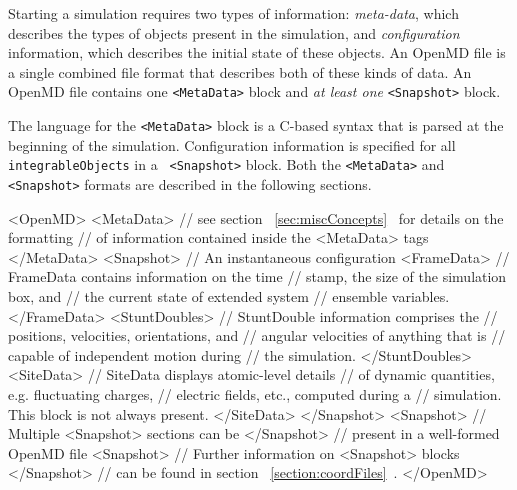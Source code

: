 \documentclass[letterpaper]{report}
\begin{document}
Starting a simulation requires two types of information: {\it
meta-data}, which describes the types of objects present in the
simulation, and {\it configuration} information, which describes the
initial state of these objects.  An OpenMD file is a single
combined file format that describes both of these kinds of data.  An
OpenMD file contains one {\tt <MetaData>} block and {\it at least
one} {\tt <Snapshot>} block.

The language for the {\tt <MetaData>} block is a C-based syntax that
is parsed at the beginning of the simulation.  Configuration
information is specified for all {\tt integrableObjects} in a {\tt
<Snapshot>} block.  Both the {\tt <MetaData>} and {\tt <Snapshot>}
formats are described in the following sections.

\begin{code}[caption={[The structure of an OpenMD file]
The basic structure of an OpenMD file contains HTML-like tags to
define simulation meta-data and subsequent instantaneous configuration
information. A well-formed OpenMD file must contain one {\tt <MetaData>}
block and {\it at least one} {\tt <Snapshot>} block.  Each
{\tt <Snapshot>} is further divided into {\tt <FrameData>} and 
 {\tt <StuntDoubles>} sections.},label={sch:mdFormat}]
<OpenMD>
  <MetaData>
      // see section ~\ref{sec:miscConcepts}~ for details on the formatting
      // of information contained inside the <MetaData> tags
  </MetaData>
  <Snapshot>         // An instantaneous configuration
     <FrameData>
                     // FrameData contains information on the time
                     // stamp, the size of the simulation box, and 
                     // the current state of extended system 
                     // ensemble variables.
     </FrameData>
     <StuntDoubles>
                     // StuntDouble information comprises the 
                     // positions, velocities, orientations, and 
                     // angular velocities of anything that is 
                     // capable of independent motion during 
                     // the simulation.
     </StuntDoubles>
     <SiteData>
                    // SiteData displays atomic-level details
                    // of dynamic quantities, e.g. fluctuating charges,
                    // electric fields, etc., computed during a
                    // simulation. This block is not always present.
     </SiteData>
  </Snapshot>       
  <Snapshot>         // Multiple <Snapshot> sections can be
  </Snapshot>        // present in a well-formed OpenMD file
  <Snapshot>         // Further information on <Snapshot> blocks
  </Snapshot>        // can be found in section ~\ref{section:coordFiles}~.
</OpenMD>
\end{code}
\end{document}
